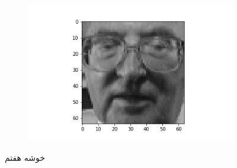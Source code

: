 \documentclass[12pt, a4paper]{article}
\begin{document}
\begin{figure}[h]
\begin{subfigure}{0.3\linewidth}
    \end{subfigure}
    \newline
    \hfill
    \begin{subfigure}{0.3\linewidth}
        \centering
        \includegraphics[width=\linewidth]{images/q3/c/6/9.png}
    \end{subfigure}
    \caption{خوشه هفتم}
\end{figure}

\clearpage
\end{document}
